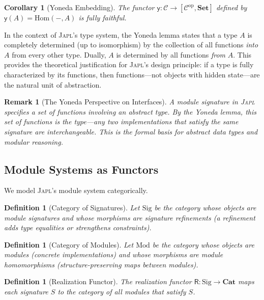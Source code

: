 \documentclass[11pt,a4paper]{article}
\newtheorem{corollary}[theorem]{Corollary}
\newtheorem{definition}[theorem]{Definition}
\newtheorem{remark}[theorem]{Remark}
\newcommand{\japl}{\textsc{Japl}}
\newcommand{\cat}[1]{\mathbf{#1}}
\newcommand{\Set}{\cat{Set}}
\newcommand{\Hom}{\mathrm{Hom}}
\newcommand{\op}{\mathrm{op}}
\newcommand{\Sig}{\mathrm{Sig}}
\newcommand{\Mod}{\mathrm{Mod}}
\begin{document}
\begin{corollary}[Yoneda Embedding]
The functor $\mathsf{y} : \mathcal{C} \to [\mathcal{C}^{\op}, \Set]$ defined by $\mathsf{y}(A) = \Hom(-, A)$ is fully faithful.
\end{corollary}

In the context of \japl{}'s type system, the Yoneda lemma states that a type $A$ is completely determined (up to isomorphism) by the collection of all functions \emph{into} $A$ from every other type. Dually, $A$ is determined by all functions \emph{from} $A$. This provides the theoretical justification for \japl{}'s design principle: if a type is fully characterized by its functions, then functions---not objects with hidden state---are the natural unit of abstraction.

\begin{remark}[The Yoneda Perspective on Interfaces]
A module signature in \japl{} specifies a set of functions involving an abstract type. By the Yoneda lemma, this set of functions \emph{is} the type---any two implementations that satisfy the same signature are interchangeable. This is the formal basis for abstract data types and modular reasoning.
\end{remark}

\subsection{Module Systems as Functors}

We model \japl{}'s module system categorically.

\begin{definition}[Category of Signatures]
Let $\Sig$ be the category whose objects are module signatures and whose morphisms are signature refinements (a refinement adds type equalities or strengthens constraints).
\end{definition}

\begin{definition}[Category of Modules]
Let $\Mod$ be the category whose objects are modules (concrete implementations) and whose morphisms are module homomorphisms (structure-preserving maps between modules).
\end{definition}

\begin{definition}[Realization Functor]
The \emph{realization functor} $\mathsf{R} : \Sig \to \cat{Cat}$ maps each signature $S$ to the category of all modules that satisfy $S$.
\end{definition}
\end{document}
